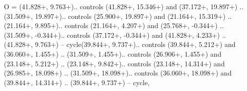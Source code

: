 {O} = {(41.828+\ctpXshift, 9.763+\ctpYshift).. controls (41.828+\ctpXshift, 15.346+\ctpYshift) and (37.172+\ctpXshift, 19.897+\ctpYshift) .. (31.509+\ctpXshift, 19.897+\ctpYshift).. controls (25.900+\ctpXshift, 19.897+\ctpYshift) and (21.164+\ctpXshift, 15.319+\ctpYshift) .. (21.164+\ctpXshift, 9.895+\ctpYshift).. controls (21.164+\ctpXshift, 4.207+\ctpYshift) and (25.768+\ctpXshift, -0.344+\ctpYshift) .. (31.509+\ctpXshift, -0.344+\ctpYshift).. controls (37.172+\ctpXshift, -0.344+\ctpYshift) and (41.828+\ctpXshift, 4.233+\ctpYshift) .. (41.828+\ctpXshift, 9.763+\ctpYshift) -- cycle(39.844+\ctpXshift, 9.737+\ctpYshift).. controls (39.844+\ctpXshift, 5.212+\ctpYshift) and (36.060+\ctpXshift, 1.455+\ctpYshift) .. (31.509+\ctpXshift, 1.455+\ctpYshift).. controls (26.906+\ctpXshift, 1.455+\ctpYshift) and (23.148+\ctpXshift, 5.212+\ctpYshift) .. (23.148+\ctpXshift, 9.842+\ctpYshift).. controls (23.148+\ctpXshift, 14.314+\ctpYshift) and (26.985+\ctpXshift, 18.098+\ctpYshift) .. (31.509+\ctpXshift, 18.098+\ctpYshift).. controls (36.060+\ctpXshift, 18.098+\ctpYshift) and (39.844+\ctpXshift, 14.314+\ctpYshift) .. (39.844+\ctpXshift, 9.737+\ctpYshift) -- cycle},
